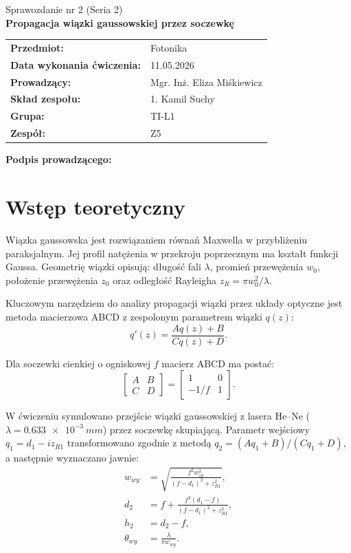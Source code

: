 \documentclass[a4paper,12pt]{article}
\title{}
\date{}
\begin{document}
\begin{titlepage}
\centering
{\Large Sprawozdanie nr 2 (Seria 2)\\[6pt]}
{\LARGE \textbf{Propagacja wiązki gaussowskiej przez soczewkę}\\[18pt]}

\begin{tabular}{@{}ll@{}}
\textbf{Przedmiot:} & Fotonika \\
\textbf{Data wykonania ćwiczenia:} & 11.05.2026 \\
\textbf{Prowadzący:} & Mgr. Inż. Eliza Miśkiewicz \\
\textbf{Skład zespołu:} & 1. Kamil Suchy \\
\textbf{Grupa:} & TI-L1 \\
\textbf{Zespół:} & Z5 \\
\end{tabular}

\vfill
\noindent\textbf{Podpis prowadzącego:} \hrulefill
\end{titlepage}

\section{Wstęp teoretyczny}

Wiązka gaussowska jest rozwiązaniem równań Maxwella w przybliżeniu paraksjalnym. Jej profil natężenia w przekroju poprzecznym ma kształt funkcji Gaussa. Geometrię wiązki opisują: długość fali $\lambda$, promień przewężenia $w_0$, położenie przewężenia $z_0$ oraz odległość Rayleigha $z_R = \pi w_0^2/\lambda$.

Kluczowym narzędziem do analizy propagacji wiązki przez układy optyczne jest metoda macierzowa ABCD z zespolonym parametrem wiązki $q(z)$:
\begin{equation}
q'(z) = \frac{Aq(z) + B}{Cq(z) + D}.
\end{equation}

Dla soczewki cienkiej o ogniskowej $f$ macierz ABCD ma postać:
\begin{equation}
\begin{bmatrix} A & B \\ C & D \end{bmatrix}
= \begin{bmatrix} 1 & 0 \\ -1/f & 1 \end{bmatrix}.
\end{equation}

W ćwiczeniu symulowano przejście wiązki gaussowskiej z lasera He--Ne ($\lambda = \SI{0,633e-3}{mm}$) przez soczewkę skupiającą. Parametr wejściowy $q_1 = d_1 - i z_{R1}$ transformowano zgodnie z metodą $q_2 = (Aq_1 + B)/(Cq_1 + D)$, a następnie wyznaczano jawnie:
\begin{align}
w_{wy} &= \sqrt{\frac{f^2 w_{10}^2}{(f-d_1)^2 + z_{R1}^2}}, \\[4pt]
d_2 &= f + \frac{f^2(d_1-f)}{(f-d_1)^2 + z_{R1}^2}, \\[4pt]
h_2 &= d_2 - f, \\[4pt]
\theta_{wy} &= \frac{\lambda}{\pi w_{wy}}.
\end{align}
\end{document}
